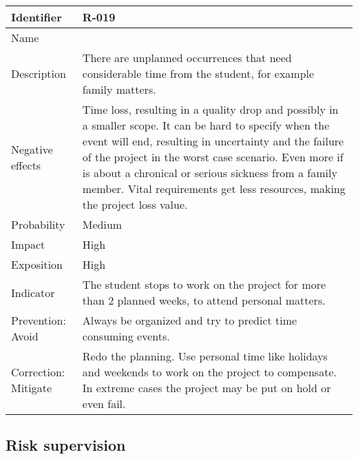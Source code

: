 \begin{table}[H]
	\begin{tabularx}{\textwidth}{|y|z|}
		\hline
		Identifier & \textbf{R-019} \\ \hline
		Name & \Rdiecinueve \\ \hline
		Description &
			There are unplanned occurrences that need considerable time from the student, for example family matters.
		\\ \hline
		Negative effects &
			Time loss, resulting in a quality drop and possibly in a smaller scope.\linej
			It can be hard to specify when the event will end, resulting in uncertainty and the failure of the project in the worst case scenario. Even more if is about a chronical or serious sickness from a family member. \linej
			Vital requirements get less resources, making the project loss value.
		\\ \hline
		Probability & Medium\\ \hline
		Impact & High\\ \hline
		Exposition & High\\ \hline
		Indicator & The student stops to work on the project for more than 2 planned weeks, to attend personal matters.\\ \hline
		Prevention: Avoid &
			Always be organized and try to predict time consuming events.
		\\ \hline
		Correction: Mitigate &
			Redo the planning. \linej
			Use personal time like holidays and weekends to work on the project to compensate.
			In extreme cases the project may be put on hold or even fail.
		\\ \hline
	\end{tabularx}
\end{table}







\subsection{Risk supervision}



